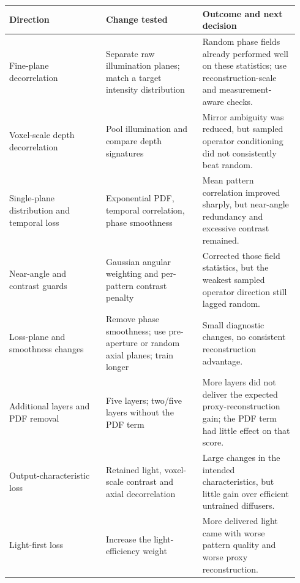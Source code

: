\par\medskip\noindent\begin{minipage}{\linewidth}
\centering
\begin{tabular}{@{}>{\raggedright\arraybackslash}p{0.313333\linewidth}@{\hspace{0.03\linewidth}}>{\raggedright\arraybackslash}p{0.313333\linewidth}@{\hspace{0.03\linewidth}}>{\raggedright\arraybackslash}p{0.313333\linewidth}@{}}\toprule
Direction & Change tested & Outcome and next decision \\
\midrule
Fine-plane decorrelation & Separate raw illumination planes; match a target intensity distribution & Random phase fields already performed well on these statistics; use reconstruction-scale and measurement-aware checks. \\
Voxel-scale depth decorrelation & Pool illumination and compare depth signatures & Mirror ambiguity was reduced, but sampled operator conditioning did not consistently beat random. \\
Single-plane distribution and temporal loss & Exponential PDF, temporal correlation, phase smoothness & Mean pattern correlation improved sharply, but near-angle redundancy and excessive contrast remained. \\
Near-angle and contrast guards & Gaussian angular weighting and per-pattern contrast penalty & Corrected those field statistics, but the weakest sampled operator direction still lagged random. \\
Loss-plane and smoothness changes & Remove phase smoothness; use pre-aperture or random axial planes; train longer & Small diagnostic changes, no consistent reconstruction advantage. \\
Additional layers and PDF removal & Five layers; two/five layers without the PDF term & More layers did not deliver the expected proxy-reconstruction gain; the PDF term had little effect on that score. \\
Output-characteristic loss & Retained light, voxel-scale contrast and axial decorrelation & Large changes in the intended characteristics, but little gain over efficient untrained diffusers. \\
Light-first loss & Increase the light-efficiency weight & More delivered light came with worse pattern quality and worse proxy reconstruction. \\
\bottomrule\end{tabular}
\end{minipage}\par\medskip


